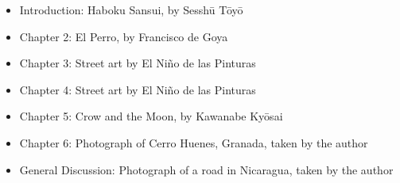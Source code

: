 \documentclass[12pt,a4paper,twoside,fleqn]{memoir}
\begin{document}
\begin{itemize}
\item Introduction: Haboku Sansui, by Sesshū Tōyō
\item Chapter 2: El Perro, by Francisco de Goya
\item Chapter 3: Street art by El Niño de las Pinturas
\item Chapter 4: Street art by El Niño de las Pinturas
\item Chapter 5: Crow and the Moon, by Kawanabe Kyōsai
\item Chapter 6: Photograph of Cerro Huenes, Granada, taken by the author
\item General Discussion: Photograph of a road in Nicaragua, taken by the author
\end{itemize}

\clearpage


\tableofcontents* %

\clearpage

\listoffigures %



\listoftables %





\end{document}
